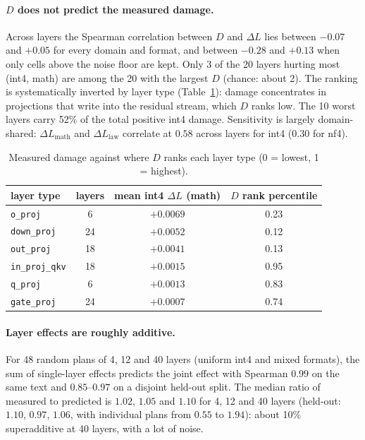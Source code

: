 \documentclass[11pt]{article}
\newcommand{\code}[1]{\texttt{#1}}
\begin{document}
\paragraph{$D$ does not predict the measured damage.}
Across layers the Spearman correlation between $D$ and $\Delta L$ lies between $-0.07$ and $+0.05$ for every
domain and format, and between $-0.28$ and $+0.13$ when only cells above the noise floor are kept. Only 3 of the 20 layers
hurting most (int4, math) are among the 20 with the largest $D$ (chance: about 2). The ranking is systematically inverted by layer type
(Table~\ref{tab:layertype}): damage concentrates in projections that write into the residual stream, which $D$ ranks low.
The 10 worst layers carry 52\% of the total positive int4 damage. Sensitivity is largely domain-shared: $\Delta L_{\text{math}}$ and
$\Delta L_{\text{law}}$ correlate at $0.58$ across layers for int4 ($0.30$ for nf4).
\begin{table}[h]
\centering\small
\begin{tabular}{lccc}
\toprule
layer type & layers & mean int4 $\Delta L$ (math) & $D$ rank percentile\\
\midrule
\code{o\_proj} & 6 & $+0.0069$ & 0.23\\
\code{down\_proj} & 24 & $+0.0052$ & 0.12\\
\code{out\_proj} & 18 & $+0.0041$ & 0.13\\
\code{in\_proj\_qkv} & 18 & $+0.0015$ & 0.95\\
\code{q\_proj} & 6 & $+0.0013$ & 0.83\\
\code{gate\_proj} & 24 & $+0.0007$ & 0.74\\
\bottomrule
\end{tabular}
\caption{Measured damage against where $D$ ranks each layer type (0 = lowest, 1 = highest).}
\label{tab:layertype}
\end{table}

\paragraph{Layer effects are roughly additive.}
For 48 random plans of 4, 12 and 40 layers (uniform int4 and mixed formats), the sum of single-layer effects predicts the joint effect with Spearman
$0.99$ on the same text and $0.85$--$0.97$ on a disjoint held-out split. The median ratio of measured to predicted is $1.02$, $1.05$ and $1.10$
for 4, 12 and 40 layers (held-out: $1.10$, $0.97$, $1.06$, with individual plans from $0.55$ to $1.94$): about 10\% superadditive at 40 layers, with a lot of noise.
\end{document}
